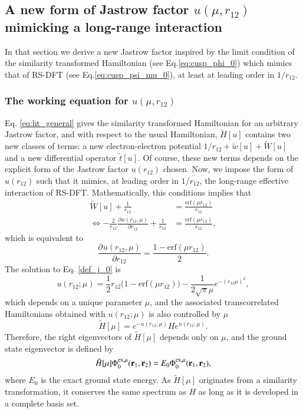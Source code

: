 \documentclass[aip,jcp,reprint,noshowkeys,superscriptaddress]{revtex4-1}
\newcommand{\deriv}[3]{\frac{\partial^{#3} #1}{\partial {#2}^{#3}}}
\newcommand{\br}[0]{{\bf {r}}}
\newcommand{\phimu}[0]{\Phi^{\text{ex},\mu}_0}
\begin{document}
\subsection{A new form of Jastrow factor $u(\mu,r_{12})$ mimicking a long-range interaction}
In that section we derive a new Jastrow factor inspired by the limit condition of the similarity transformed Hamiltonian (see Eq.\eqref{eq:cusp_phi_0}) which mimics that of RS-DFT (see Eq.\eqref{eq:cusp_psi_mu_0}), at least at leading order in $1/r_{12}$. 
\subsubsection{The working equation for $u(\mu,r_{12})$ }
Eq. \eqref{eq:ht_general} gives the similarity transformed Hamiltonian for an arbitrary Jastrow factor, 
and with respect to the usual Hamiltonian, $\tilde{H}[u]$ contains two new classes of terms: 
a new electron-electron potential $1/r_{12} + \tilde{w}[u]+ \tilde{W}[u]$ and a new differential operator  $\tilde{t}[u]$. 
Of course, these new terms depends on the explicit form of the Jastrow factor $u(r_{12})$ chosen. 
Now, we impose the form of $u(r_{12})$ such that it mimics, at leading order in $1/r_{12}$, the long-range effective interaction of RS-DFT. 
Mathematically, this conditions implies that 
\begin{equation}
 \begin{aligned}
 \label{def_j_00}
 \tilde{W}[u] + \frac{1}{r_{12}}&= \frac{\text{erf}(\mu r_{12})}{r_{12}} \\ 
\Leftrightarrow -\frac{2}{r_{12}} \deriv{u(r_{12},\mu)}{r_{12}}{} + \frac{1}{r_{12}} & = \frac{\text{erf}(\mu r_{12})}{r_{12}}, 
 \end{aligned}
\end{equation}
which is equivalent to 
\begin{equation}
 \label{def_j_0}
 \deriv{u(r_{12},\mu)}{r_{12}}{} = \frac{1 - \text{erf}(\mu r_{12})}{2}.
\end{equation}
The solution to Eq. \eqref{def_j_0} is 
\begin{equation}
 \label{eq:def_j}
 u(r_{12};\mu) = \frac{1}{2}r_{12}\bigg( 1 - \text{erf}(\mu r_{12})  \bigg) - \frac{1}{2\sqrt{\pi}\mu}e^{-(r_{12}\mu)^2},
\end{equation}
which depends on a unique parameter $\mu$,  
and the associated transcorrelated Hamiltonians obtained with $u(r_{12};\mu)$ is also controlled by $\mu$
\begin{equation}
 \label{eq:def_ht_mu}
 \tilde{H}[\mu] = e^{-u(r_{12};\mu)} H e^{u(r_{12};\mu)}. 
\end{equation}
Therefore, the right eigenvectors of $\tilde{H}[\mu]$ depends only on $\mu$, and the ground state eigenvector is defined by 
\begin{equation}
 \tilde{H}[\mu] \phimu(\br{}_{1},\br{}_{2}) = E_0 \phimu(\br{}_{1},\br{}_{2}), 
\end{equation}
where $E_0$ is the exact ground state energy. 
As $\tilde{H}[\mu]$ originates from a similarity transformation, it conserves the same spectrum as $H$ as long as it is developed in a complete basis set. 
\end{document}
